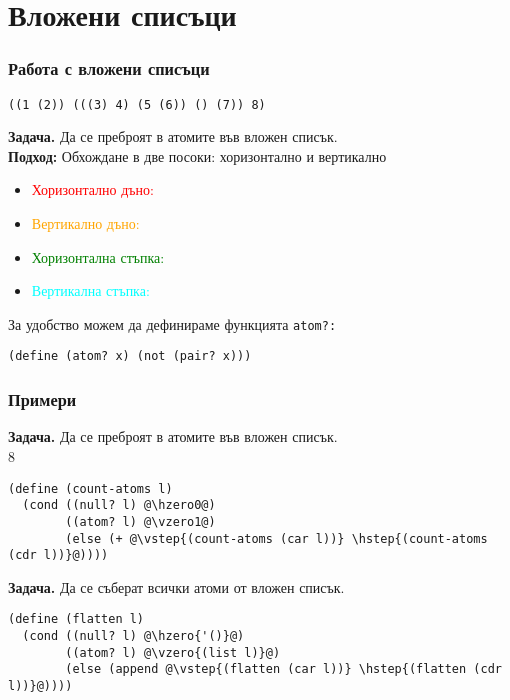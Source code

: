 \documentclass{beamer}
\begin{document}
\section{Вложени списъци}

\newcommand{\hzero}{\textcolor{red}}
\newcommand{\vzero}{\textcolor{orange}}
\newcommand{\hstep}{\textcolor{green}}
\newcommand{\vstep}{\textcolor{cyan}}

\begin{frame}[fragile]
  \frametitle{Работа с вложени списъци}

\begin{verbatim}
((1 (2)) (((3) 4) (5 (6)) () (7)) 8)
\end{verbatim}
  \textbf{Задача.} Да се преброят в атомите във вложен списък.\\
  \textbf{Подход:} Обхождане в две посоки: хоризонтално и вертикално
  \pause
  \begin{itemize}[<+->]
  \item \hzero{Хоризонтално дъно:} 
  \item \vzero{Вертикално дъно:} 
  \item \hstep{Хоризонтална стъпка:} 
  \item \vstep{Вертикална стъпка:} 
  \end{itemize}
  \vspace{1em}
  \onslide<+->
  За удобство можем да дефинираме функцията \tt{atom?}:
\begin{lstlisting}
(define (atom? x) (not (pair? x)))
\end{lstlisting}
\end{frame}

\begin{frame}[fragile]
  \frametitle{Примери}
  \small
  \textbf{Задача.} Да се преброят в атомите във вложен списък.\\
  8
  \pause
\begin{lstlisting}
(define (count-atoms l)
  (cond ((null? l) @\hzero0@)
        ((atom? l) @\vzero1@)
        (else (+ @\vstep{(count-atoms (car l))} \hstep{(count-atoms (cdr l))}@))))
\end{lstlisting}
  \vspace{1em}
  \pause
  \textbf{Задача.} Да се съберат всички атоми от вложен списък.\\
  \pause
\begin{lstlisting}
(define (flatten l)
  (cond ((null? l) @\hzero{'()}@)
        ((atom? l) @\vzero{(list l)}@)
        (else (append @\vstep{(flatten (car l))} \hstep{(flatten (cdr l))}@))))
\end{lstlisting}
\end{frame}
\end{document}
